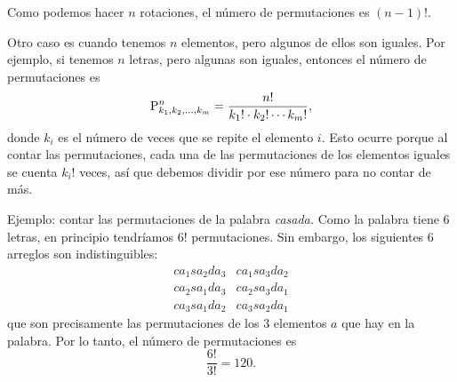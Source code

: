 Como podemos hacer \(n\) rotaciones, el número de permutaciones es \((n-1)!\).

Otro caso es cuando tenemos \(n\) elementos, pero algunos de ellos son iguales. Por ejemplo, si tenemos \(n\) letras, pero algunas son iguales, entonces el número de permutaciones es \[\mathrm{P}^{n}_{k_1, k_2, \ldots, k_m} = \frac{n!}{k_1! \cdot k_2! \cdots k_m!},\] donde \(k_i\) es el número de veces que se repite el elemento \(i\). Esto ocurre porque al contar las permutaciones, cada una de las permutaciones de los elementos iguales se cuenta \(k_i!\) veces, así que debemos dividir por ese número para no contar de más.

Ejemplo: contar las permutaciones de la palabra \emph{casada.} Como la palabra tiene \(6\) letras, en principio tendríamos \(6!\) permutaciones. Sin embargo, los siguientes 6 arreglos son indistinguibles:
\[
\begin{matrix}
	ca_1sa_2da_3 & ca_1sa_3da_2 \\
	ca_2sa_1da_3 & ca_2sa_3da_1\\
	ca_3sa_1da_2 & ca_3sa_2da_1
\end{matrix}
\]que son precisamente las permutaciones de los \(3\) elementos \(a\) que hay en la palabra. Por lo tanto, el número de permutaciones es \[\frac{6!}{3!} = 120.\]
